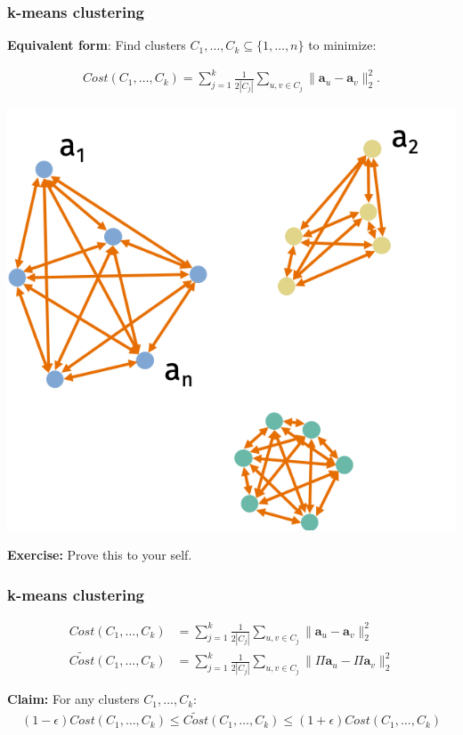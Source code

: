 \documentclass[compress]{beamer}
\newcommand{\bv}[1]{\mathbf{#1}}
\begin{document}
\begin{frame}[t]
	\frametitle{k-means clustering}
	\textbf{Equivalent form}: Find clusters $C_1, \ldots, C_k \subseteq \{1, \ldots, n\}$ to minimize:
	\vspace{-3em}
	
	\begin{align*}
		Cost(C_1,\ldots, C_k) = \sum_{j=1}^k \frac{1}{2|C_j|}\sum_{u,v\in C_j} \|\bv{a}_u - \bv{a}_v\|_2^2.
	\end{align*}
	\vspace{-2em}
	\begin{center}
		\includegraphics[width=.5\textwidth]{kmeans4.png}
	\end{center}
	\textbf{Exercise:} Prove this to your self.
\end{frame}

\begin{frame}[t]
	\frametitle{k-means clustering}
	\begin{align*}
		Cost(C_1,\ldots, C_k) &= \sum_{j=1}^k \frac{1}{2|C_j|}\sum_{u,v\in C_j} \|\bv{a}_u - \bv{a}_v\|_2^2 \\
		\widetilde{Cost}(C_1,\ldots, C_k) &= \sum_{j=1}^k \frac{1}{2|C_j|}\sum_{u,v\in C_j} \|\Pi\bv{a}_u - \Pi\bv{a}_v\|_2^2
	\end{align*}
	
	
	\textbf{Claim:} For any clusters $C_1, \ldots, C_k$:
	\begin{align*}
		(1-\epsilon) Cost(C_1, \ldots, C_k) \leq \widetilde{Cost}(C_1, \ldots, C_k)   \leq  (1+\epsilon) Cost(C_1, \ldots, C_k) 
	\end{align*}
	
\end{frame}
\end{document}
